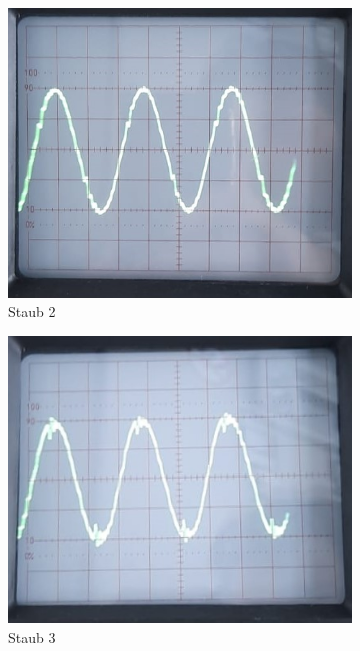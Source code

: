 \begin{figure}[H]
\begin{subfigure}[c]{0.19\textwidth}
		\includegraphics[width=\textwidth]{Abbildungen/Oszi_Staub_2.jpg}
		\caption{Staub 2}
	\end{subfigure}
	\begin{subfigure}[c]{0.19\textwidth}
		\includegraphics[width=\textwidth]{Abbildungen/Oszi_Staub_3.jpg}
		\caption{Staub 3}
	\end{subfigure}
	\begin{subfigure}[c]{0.19\textwidth}

\end{subfigure}
\end{figure}

